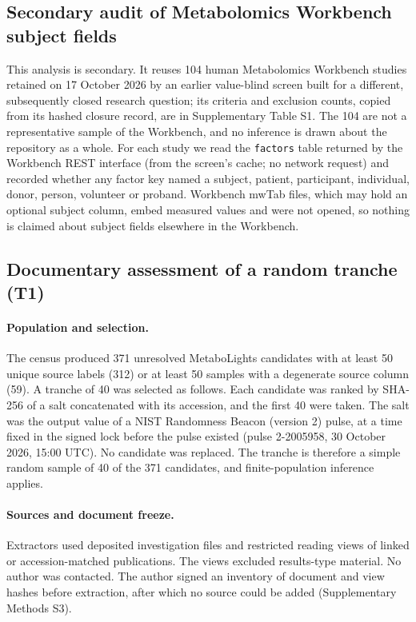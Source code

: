 \subsection{Secondary audit of Metabolomics Workbench subject fields}\label{sec:workbench}

This analysis is secondary. It reuses 104 human Metabolomics Workbench studies retained on 17 October 2026 by an
earlier value-blind screen built for a different, subsequently closed research question; its criteria and exclusion
counts, copied from its hashed closure record, are in Supplementary Table S1. The 104 are not a representative sample
of the Workbench, and no inference is drawn about the repository as a whole. For each study we read the
\texttt{factors} table returned by the Workbench REST interface (from the screen's cache; no network request) and
recorded whether any factor key named a subject, patient, participant, individual, donor, person, volunteer or proband.
Workbench mwTab files, which may hold an optional subject column, embed measured values and were not opened, so nothing
is claimed about subject fields elsewhere in the Workbench.

\subsection{Documentary assessment of a random tranche (T1)}\label{sec:t1}

\paragraph{Population and selection.} The census produced 371 unresolved MetaboLights candidates with at least 50
unique source labels (312) or at least 50 samples with a degenerate source column (59). A tranche of 40 was selected
as follows. Each candidate was ranked by SHA-256 of a salt concatenated with its accession, and the first 40 were
taken. The salt was the output value of a NIST Randomness Beacon (version 2) pulse, at a time fixed in the signed lock
before the pulse existed (pulse 2-2005958, 30 October 2026, 15:00 UTC). No candidate was replaced. The tranche is
therefore a simple random sample of 40 of the 371 candidates, and finite-population inference applies.

\paragraph{Sources and document freeze.} Extractors used deposited investigation files and restricted reading views of
linked or accession-matched publications. The views excluded results-type material. No author was contacted. The
author signed an inventory of document and view hashes before extraction, after which no source could be added
(Supplementary Methods S3).

